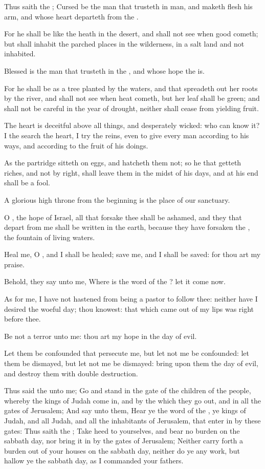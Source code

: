 \verse Thus saith the \LORD; Cursed be the man that trusteth in man, and maketh flesh his arm, and whose heart departeth from the \LORD.

\verse For he shall be like the heath in the desert, and shall not see when good cometh; but shall inhabit the parched places in the wilderness, in a salt land and not inhabited.

\verse Blessed is the man that trusteth in the \LORD, and whose hope the \LORD is.

\verse For he shall be as a tree planted by the waters, and that spreadeth out her roots by the river, and shall not see when heat cometh, but her leaf shall be green; and shall not be careful in the year of drought, neither shall cease from yielding fruit.

\verse The heart is deceitful above all things, and desperately wicked: who can know it?  \verse I the \LORD search the heart, I try the reins, even to give every man according to his ways, and according to the fruit of his doings.

\verse As the partridge sitteth on eggs, and hatcheth them not; so he that getteth riches, and not by right, shall leave them in the midst of his days, and at his end shall be a fool.

\verse A glorious high throne from the beginning is the place of our sanctuary.

\verse O \LORD, the hope of Israel, all that forsake thee shall be ashamed, and they that depart from me shall be written in the earth, because they have forsaken the \LORD, the fountain of living waters.

\verse Heal me, O \LORD, and I shall be healed; save me, and I shall be saved: for thou art my praise.

\verse Behold, they say unto me, Where is the word of the \LORD? let it come now.

\verse As for me, I have not hastened from being a pastor to follow thee: neither have I desired the woeful day; thou knowest: that which came out of my lips was right before thee.

\verse Be not a terror unto me: thou art my hope in the day of evil.

\verse Let them be confounded that persecute me, but let not me be confounded: let them be dismayed, but let not me be dismayed: bring upon them the day of evil, and destroy them with double destruction.

\verse Thus said the \LORD unto me; Go and stand in the gate of the children of the people, whereby the kings of Judah come in, and by the which they go out, and in all the gates of Jerusalem; \verse And say unto them, Hear ye the word of the \LORD, ye kings of Judah, and all Judah, and all the inhabitants of Jerusalem, that enter in by these gates: \verse Thus saith the \LORD; Take heed to yourselves, and bear no burden on the sabbath day, nor bring it in by the gates of Jerusalem; \verse Neither carry forth a burden out of your houses on the sabbath day, neither do ye any work, but hallow ye the sabbath day, as I commanded your fathers.

